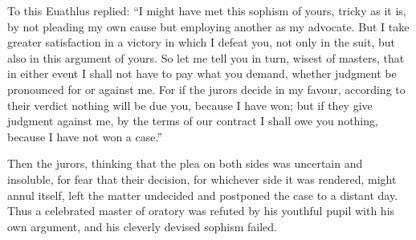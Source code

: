 To this Euathlus replied: ``I might have met this sophism of yours,
tricky as it is, by not pleading my own cause but employing another as
my advocate. But I take greater satisfaction in a victory in which
 I defeat you, not only in the suit, but also in this
argument of yours. So let me tell you in turn, wisest of masters, that
in either event I shall not have to pay what you demand, whether
judgment be pronounced for or against me. For if the jurors decide in
my favour, according to their verdict nothing will be due you, because
I have won; but if they give judgment against me, by the terms of our
contract I shall owe you nothing, because I have not won a case.''

Then the jurors, thinking that the plea on both sides was uncertain
and insoluble, for fear that their decision, for whichever side it was
rendered, might annul itself, left the matter undecided and postponed
the case to a distant day. Thus a celebrated master of oratory was
refuted by his youthful pupil with his own argument, and his cleverly
devised sophism failed.

